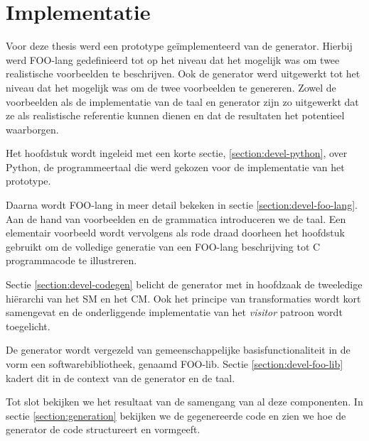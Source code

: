 
\chapter{Implementatie}
\label{chapter:implementatie}

Voor deze thesis werd een prototype ge\"implementeerd van de generator. Hierbij
werd FOO-lang gedefinieerd tot op het niveau dat het mogelijk was om twee
realistische voorbeelden te beschrijven. Ook de generator werd uitgewerkt tot
het niveau dat het mogelijk was om de twee voorbeelden te genereren. Zowel de
voorbeelden als de implementatie van de taal en generator zijn zo uitgewerkt
dat ze als realistische referentie kunnen dienen en dat de resultaten het
potentieel waarborgen.

Het hoofdstuk wordt ingeleid met een korte sectie, \ref{section:devel-python},
over Python, de programmeertaal die werd gekozen voor de implementatie van het
prototype.

Daarna wordt FOO-lang in meer detail bekeken in sectie
\ref{section:devel-foo-lang}. Aan de hand van voorbeelden en de grammatica
introduceren we de taal. Een elementair voorbeeld wordt vervolgens als rode
draad doorheen het hoofdstuk gebruikt om de volledige generatie van een
FOO-lang beschrijving tot C programmacode te illustreren.

Sectie \ref{section:devel-codegen} belicht de generator met in hoofdzaak de
tweeledige hi\"erarchi van het SM en het CM. Ook het principe van
transformaties wordt kort samengevat en de onderliggende implementatie van het
\emph{visitor} patroon \citep{gamma1994design} wordt toegelicht.

De generator wordt vergezeld van gemeenschappelijke basisfunctionaliteit in de
vorm een softwarebibliotheek, genaamd FOO-lib. Sectie
\ref{section:devel-foo-lib} kadert dit in de context van de generator en de
taal.

Tot slot bekijken we het resultaat van de samengang van al deze componenten. In
sectie \ref{section:generation} bekijken we de gegenereerde code en zien we hoe
de generator de code structureert en vormgeeft.






